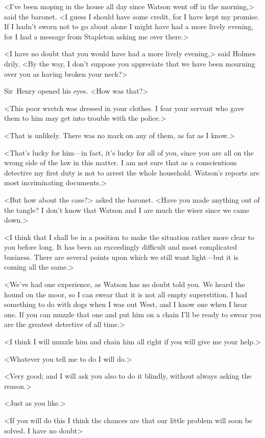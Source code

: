 <I've been moping in the house all day since Watson went off in the morning,> said the baronet. <I guess I should have some credit, for I have kept my promise. If I hadn't sworn not to go about alone I might have had a more lively evening, for I had a message from Stapleton asking me over there.>

<I have no doubt that you would have had a more lively evening,> said Holmes drily. <By the way, I don't suppose you appreciate that we have been mourning over you as having broken your neck?>

Sir~Henry opened his eyes. <How was that?>

<This poor wretch was dressed in your clothes. I fear your servant who gave them to him may get into trouble with the police.>

<That is unlikely. There was no mark on any of them, as far as I know.>

<That's lucky for him—in fact, it's lucky for all of you, since you are all on the wrong side of the law in this matter. I am not sure that as a conscientious detective my first duty is not to arrest the whole household. Watson's reports are most incriminating documents.>

<But how about the case?> asked the baronet. <Have you made anything out of the tangle? I don't know that Watson and I are much the wiser since we came down.>

<I think that I shall be in a position to make the situation rather more clear to you before long. It has been an exceedingly difficult and most complicated business. There are several points upon which we still want light—but it is coming all the same.>

<We've had one experience, as Watson has no doubt told you. We heard the hound on the moor, so I can swear that it is not all empty superstition. I had something to do with dogs when I was out West, and I know one when I hear one. If you can muzzle that one and put him on a chain I'll be ready to swear you are the greatest detective of all time.>

<I think I will muzzle him and chain him all right if you will give me your help.>

<Whatever you tell me to do I will do.>

<Very good; and I will ask you also to do it blindly, without always asking the reason.>

<Just as you like.>

<If you will do this I think the chances are that our little problem will soon be solved. I have no doubt\longdash>

